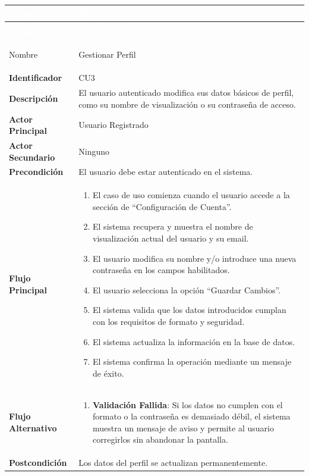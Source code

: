 \newpage

\begingroup
\small 
\renewcommand{\arraystretch}{1.4}
\begin{xltabular}{\textwidth}{|>{\bfseries}p{3.5cm}|X|}
    \textcolor{white}{Campo} & \textcolor{white}{Descripción} \\ \hline
    \endfirsthead

     \\
    \hline
    \textcolor{white}{Campo} & \textcolor{white}{Descripción} \\ \hline
    \endhead

    Nombre & Gestionar Perfil \\ \hline
    Identificador & CU3 \\ \hline
    Descripción & El usuario autenticado modifica sus datos básicos de perfil, como su nombre de visualización o su contraseña de acceso. \\ \hline
    Actor Principal & Usuario Registrado \\ \hline
    Actor Secundario & Ninguno \\ \hline
    Precondición & El usuario debe estar autenticado en el sistema. \\ \hline
    Flujo Principal & 
    \begin{enumerate}[leftmargin=0.5cm, topsep=0pt, partopsep=0pt, parsep=0pt, itemsep=4pt]
        \item El caso de uso comienza cuando el usuario accede a la sección de ``Configuración de Cuenta''.
        \item El sistema recupera y muestra el nombre de visualización actual del usuario y su email.
        \item El usuario modifica su nombre y/o introduce una nueva contraseña en los campos habilitados.
        \item El usuario selecciona la opción ``Guardar Cambios''.
        \item El sistema valida que los datos introducidos cumplan con los requisitos de formato y seguridad.
        \item El sistema actualiza la información en la base de datos.
        \item El sistema confirma la operación mediante un mensaje de éxito.
    \end{enumerate} 
    \\ \hline
    Flujo Alternativo & 
    \begin{enumerate}[leftmargin=0.5cm, topsep=0pt, partopsep=0pt, parsep=0pt, itemsep=4pt]
        \item \textbf{Validación Fallida}: Si los datos no cumplen con el formato o la contraseña es demasiado débil, el sistema muestra un mensaje de aviso y permite al usuario corregirlos sin abandonar la pantalla.
    \end{enumerate}
    \\ \hline
    Postcondición & Los datos del perfil se actualizan permanentemente. \\ \hline


\end{xltabular}
